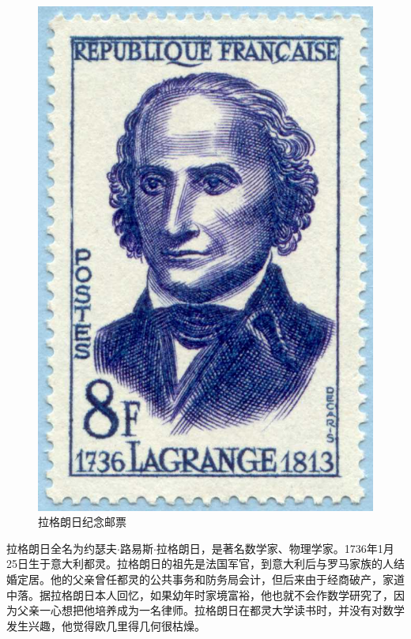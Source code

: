 \documentclass[b5paper]{ctexart}
\begin{document}
\begin{figure}
 \centering
 \includegraphics[scale=1.5]{img/lagrange.jpg}
 \captionsetup{labelformat=empty}
 \caption{拉格朗日纪念邮票}
 \label{fig:Lagrange}
\end{figure}

拉格朗日全名为约瑟夫$\cdot$路易斯$\cdot$拉格朗日，是著名数学家、物理学家。1736年1月25日生于意大利都灵。拉格朗日的祖先是法国军官，到意大利后与罗马家族的人结婚定居。他的父亲曾任都灵的公共事务和防务局会计，但后来由于经商破产，家道中落。据拉格朗日本人回忆，如果幼年时家境富裕，他也就不会作数学研究了，因为父亲一心想把他培养成为一名律师。拉格朗日在都灵大学读书时，并没有对数学发生兴趣，他觉得欧几里得几何很枯燥。
\end{document}
